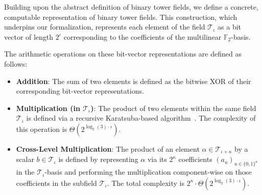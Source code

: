 \begin{definition}
  \label{def:computable_binary_tower_field}
  Building upon the abstract definition of binary tower fields, we define a concrete, computable representation of binary tower fields. This construction, which underpins our formalization, represents each element of the field $\mathcal{T}_\iota$ as a bit vector of length $2^\iota$ corresponding to the coefficients of the multilinear $\mathbb{F}_2$-basis.

  The arithmetic operations on these bit-vector representations are defined as follows:
  \begin{itemize}
      \item \textbf{Addition}: The sum of two elements is defined as the bitwise XOR of their corresponding bit-vector representations.
      
      \item \textbf{Multiplication (in $\mathcal{T}_\iota$)}: The product of two elements within the same field $\mathcal{T}_\iota$ is defined via a recursive Karatsuba-based algorithm~\cite{FP97}. The complexity of this operation is $\Theta(2^{\log_2(3) \cdot \iota})$.
      
      \item \textbf{Cross-Level Multiplication}: The product of an element $\alpha \in \mathcal{T}_{\iota+\kappa}$ by a scalar $b \in \mathcal{T}_\iota$ is defined by representing $\alpha$ via its $2^\kappa$ coefficients $(a_u)_{u \in \{0,1\}^\kappa}$ in the $\mathcal{T}_\iota$-basis and performing the multiplication component-wise on those coefficients in the subfield $\mathcal{T}_\iota$. The total complexity is $2^\kappa \cdot \Theta(2^{\log_2(3) \cdot \iota})$.
  \end{itemize}
\end{definition}